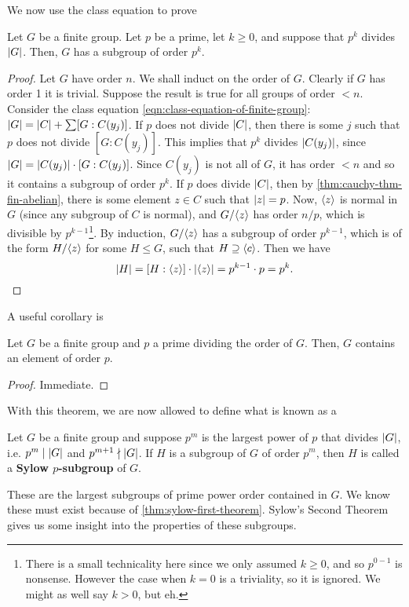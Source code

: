 \documentclass[./main.tex]{subfiles}
\begin{document}
We now use the class equation to prove
\begin{theorem}
\label{thm:sylow-first-theorem}
    Let $G$ be a finite group. Let $p$ be a prime, let $k \geq 0$, and suppose
    that $p^k$ divides $\abs G$. Then, $G$ has a subgroup of order $p^k$.
\end{theorem}
\begin{proof}
    Let $G$ have order $n$. We shall induct on the order of $G$. Clearly if $G$
    has order 1 it is trivial. Suppose the result is true for all groups of
    order $<n$. Consider the class equation
    \cref{eqn:class-equation-of-finite-group}: $\abs G = \abs C + \sum
    [G:C(y_j)]$. If $p$ does not divide $\abs C$, then there is some $j$ such
    that $p$ does not divide $[G:C(y_j)]$. This implies that $p^k$ divides
    $\abs{C(y_j)}$, since $\abs G = \abs{C(y_j)} \cdot [G:C(y_j)]$. Since
    $C(y_j)$ is not all of $G$, it has order $<n$ and so it contains a subgroup
    of order $p^k$. If $p$ does divide $\abs C$, then by
    \cref{thm:cauchy-thm-fin-abelian}, there is some element $z \in C$ such that
    $\abs z = p$. Now, ${ \langle z \rangle }$ is normal in $G$ (since any subgroup of $C$ is
    normal), and $G/{ \langle z \rangle }$ has order $n/p$, which is divisible by
    $p^{k-1}$\footnote{There is a small technicality here since we only assumed
    $k \geq 0$, and so $p^{0-1}$ is nonsense. However the case when $k = 0$ is a
    triviality, so it is ignored. We might as well say $k > 0$, but eh.}. By
    induction, $G/{ \langle z \rangle }$ has a subgroup of order $p^{k-1}$, which is of the
    form $H/{ \langle z \rangle }$ for some $H \leq G$, such that $H \supseteq { \langle c \rangle }$. Then we
    have
    \[
        \abs H = [H : \gen z] \cdot \abs{\gen z} = p^{k-1} \cdot p = p^k.
    \]
\end{proof}

A useful corollary is 
\begin{corollary}
\label{cor:cauchy-thm-finite-groups}
    Let $G$ be a finite group and $p$ a prime dividing the order of $G$. Then,
    $G$ contains an element of order $p$.
\end{corollary}
\begin{proof}
    Immediate.
\end{proof}

With this theorem, we are now allowed to define what is known as a
\begin{definition}
    Let $G$ be a finite group and suppose $p^m$ is the largest power of $p$ that
    divides $\abs G$, i.e. $p^m \mid \abs G$ and $p^{m+1} \nmid \abs G$. If $H$
    is a subgroup of $G$ of order $p^m$, then $H$ is called a \textbf{Sylow
    $p$-subgroup} of $G$.
\end{definition}
These are the largest subgroups of prime power order contained in $G$. We know
these must exist because of \cref{thm:sylow-first-theorem}. Sylow's Second
Theorem gives us some insight into the properties of these subgroups.
\end{document}
